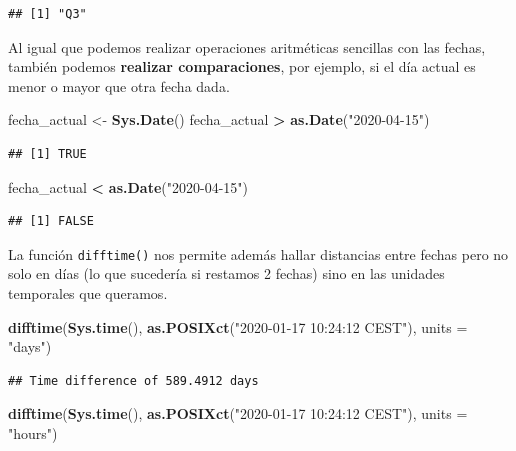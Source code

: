 \documentclass[11pt,]{book}
\newenvironment{Shaded}{\begin{snugshade}}{\end{snugshade}}
\newcommand{\DataTypeTok}[1]{\textcolor[rgb]{0.27,0.27,0.27}{#1}}
\newcommand{\KeywordTok}[1]{\textcolor[rgb]{0.27,0.27,0.27}{\textbf{#1}}}
\newcommand{\NormalTok}[1]{#1}
\newcommand{\OperatorTok}[1]{\textcolor[rgb]{0.43,0.43,0.43}{\textbf{#1}}}
\newcommand{\StringTok}[1]{\textcolor[rgb]{0.5,0.5,0.5}{#1}}
\begin{document}
\begin{verbatim}
## [1] "Q3"
\end{verbatim}

Al igual que podemos realizar operaciones aritméticas sencillas con las fechas, también podemos \textbf{realizar comparaciones}, por ejemplo, si el día actual es menor o mayor que otra fecha dada.

\begin{Shaded}
\begin{Highlighting}[]
\NormalTok{fecha_actual <-}\StringTok{ }\KeywordTok{Sys.Date}\NormalTok{()}
\NormalTok{fecha_actual }\OperatorTok{>}\StringTok{ }\KeywordTok{as.Date}\NormalTok{(}\StringTok{"2020-04-15"}\NormalTok{)}
\end{Highlighting}
\end{Shaded}

\begin{verbatim}
## [1] TRUE
\end{verbatim}

\begin{Shaded}
\begin{Highlighting}[]
\NormalTok{fecha_actual }\OperatorTok{<}\StringTok{ }\KeywordTok{as.Date}\NormalTok{(}\StringTok{"2020-04-15"}\NormalTok{)}
\end{Highlighting}
\end{Shaded}

\begin{verbatim}
## [1] FALSE
\end{verbatim}

La función \texttt{difftime()} nos permite además hallar distancias entre fechas pero no solo en días (lo que sucedería si restamos 2 fechas) sino en las unidades temporales que queramos.

\begin{Shaded}
\begin{Highlighting}[]
\KeywordTok{difftime}\NormalTok{(}\KeywordTok{Sys.time}\NormalTok{(), }\KeywordTok{as.POSIXct}\NormalTok{(}\StringTok{"2020-01-17 10:24:12 CEST"}\NormalTok{), }\DataTypeTok{units =} \StringTok{"days"}\NormalTok{)}
\end{Highlighting}
\end{Shaded}

\begin{verbatim}
## Time difference of 589.4912 days
\end{verbatim}

\begin{Shaded}
\begin{Highlighting}[]
\KeywordTok{difftime}\NormalTok{(}\KeywordTok{Sys.time}\NormalTok{(), }\KeywordTok{as.POSIXct}\NormalTok{(}\StringTok{"2020-01-17 10:24:12 CEST"}\NormalTok{), }\DataTypeTok{units =} \StringTok{"hours"}\NormalTok{)}
\end{Highlighting}
\end{Shaded}
\end{document}

